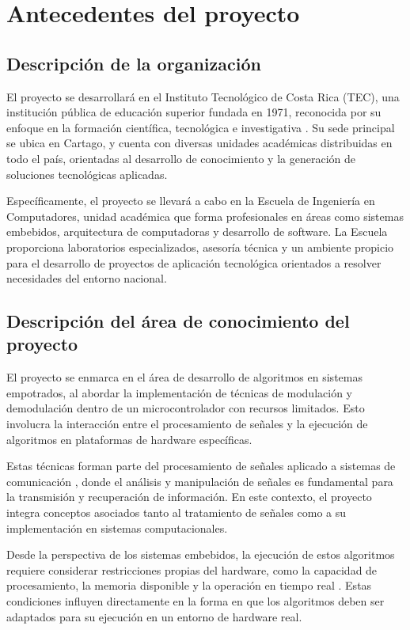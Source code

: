 \section{Antecedentes del proyecto}

\subsection{Descripción de la organización}

El proyecto se desarrollará en el Instituto Tecnológico de Costa Rica (TEC), una institución pública de educación superior fundada en 1971, reconocida por su enfoque en la formación científica, tecnológica e investigativa \cite{tec}. Su sede principal se ubica en Cartago, y cuenta con diversas unidades académicas distribuidas en todo el país, orientadas al desarrollo de conocimiento y la generación de soluciones tecnológicas aplicadas.

Específicamente, el proyecto se llevará a cabo en la Escuela de Ingeniería en Computadores, unidad académica que forma profesionales en áreas como sistemas embebidos, arquitectura de computadoras y desarrollo de software. La Escuela proporciona laboratorios especializados, asesoría técnica y un ambiente propicio para el desarrollo de proyectos de aplicación tecnológica orientados a resolver necesidades del entorno nacional.

\subsection{Descripción del área de conocimiento del proyecto}

El proyecto se enmarca en el área de desarrollo de algoritmos en sistemas empotrados, al abordar la implementación de técnicas de modulación y demodulación dentro de un microcontrolador con recursos limitados. Esto involucra la interacción entre el procesamiento de señales y la ejecución de algoritmos en plataformas de hardware específicas.

Estas técnicas forman parte del procesamiento de señales aplicado a sistemas de comunicación \cite{oppenheim1997}, donde el análisis y manipulación de señales es fundamental para la transmisión y recuperación de información. En este contexto, el proyecto integra conceptos asociados tanto al tratamiento de señales como a su implementación en sistemas computacionales.

Desde la perspectiva de los sistemas embebidos, la ejecución de estos algoritmos requiere considerar restricciones propias del hardware, como la capacidad de procesamiento, la memoria disponible y la operación en tiempo real \cite{heath2002}. Estas condiciones influyen directamente en la forma en que los algoritmos deben ser adaptados para su ejecución en un entorno de hardware real.


